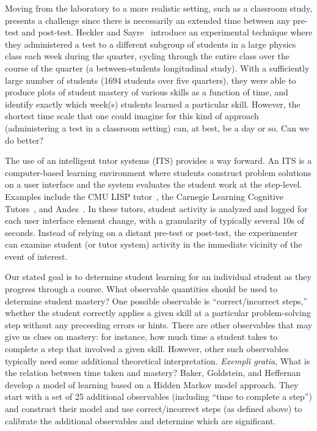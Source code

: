 \documentclass{acmlarge-edm}
\begin{document}
Moving from the laboratory to a more realistic setting, such as a
classroom study, presents a challenge since there is necessarily an
extended time between any pre-test and post-test.  Heckler and 
Sayre~\citeyear{heckler_what_2010} introduce an experimental technique
where they administered a test to a different subgroup of students in
a large physics class each week during the quarter, cycling through
the entire class over the course of the quarter (a
between-students longitudinal study).  With a sufficiently large number
of students (1694 students over five quarters), they were able to produce
plots of student mastery of various skills as a function of time, and
identify exactly which week(s) students learned a particular skill.
However, the shortest time scale that one could imagine for this
kind of approach (administering a test in a classroom setting) can, at
best, be a day or so.  Can we do better?

The use of an intelligent tutor systems (ITS) provides a way forward. 
An ITS is a computer-based learning environment where students
construct problem solutions on a user interface and the system
evaluates the student work at the step-level. 
Examples include the CMU LISP tutor~\cite{corbett_knowledge_1995}, the
Carnegie Learning Cognitive Tutors~\cite{koedinger_illustrating_1998},
and Andes~\cite{vanlehn_andes_2005}.  In these tutors, student
activity is analyzed and logged for each user interface element change, with a granularity
of typically several 10s of seconds.
Instead of relying on a distant pre-test or post-test, the experimenter can examine student
(or tutor system) activity in the immediate vicinity of the event of interest.

Our stated goal is to determine student learning for an individual
student as they progress through a course.  What observable quantities
should be used to determine student mastery?  One possible observable
is ``correct/incorrect steps,'' whether the student correctly applies
a given skill at a particular problem-solving step without any
preceeding errors or hints.  There are other observables that may give
us clues on mastery: for instance, how much time a student takes to
complete a step that involved a given skill.  However, other such
observables typically need some additional theoretical
interpretation. {\em Exempli gratia}, What is the relation between
time taken and mastery?  Baker, Goldstein, and
Heffernan~\citeyear{baker_detecting_2011} develop a model of learning
based on a Hidden Markov model approach.  They start with a set of
25 additional observables (including ``time to complete a step'') and
construct their model and use correct/incorrect steps (as defined
above) to calibrate the additional observables and determine which are
significant.
\end{document}
